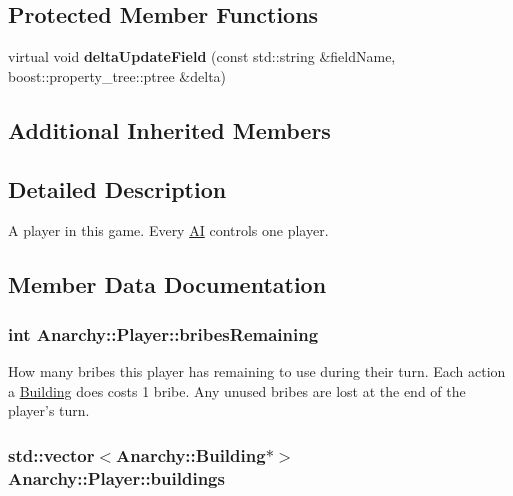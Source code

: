 \subsection*{Protected Member Functions}
\begin{DoxyCompactItemize}
\item 
\hypertarget{classAnarchy_1_1Player_a4a8fd3162e3a6eba89b48348c346c0c7}{virtual void {\bfseries delta\-Update\-Field} (const std\-::string \&field\-Name, boost\-::property\-\_\-tree\-::ptree \&delta)}\label{classAnarchy_1_1Player_a4a8fd3162e3a6eba89b48348c346c0c7}

\end{DoxyCompactItemize}
\subsection*{Additional Inherited Members}


\subsection{Detailed Description}
A player in this game. Every \hyperlink{classAnarchy_1_1AI}{A\-I} controls one player. 



\subsection{Member Data Documentation}
\hypertarget{classAnarchy_1_1Player_a439ac9bc65f337358c0169f6352a3336}{
\subsubsection[{bribes\-Remaining}]{\setlength{\rightskip}{0pt plus 5cm}int Anarchy\-::\-Player\-::bribes\-Remaining}}\label{classAnarchy_1_1Player_a439ac9bc65f337358c0169f6352a3336}


How many bribes this player has remaining to use during their turn. Each action a \hyperlink{classAnarchy_1_1Building}{Building} does costs 1 bribe. Any unused bribes are lost at the end of the player's turn. 

\hypertarget{classAnarchy_1_1Player_a2b80bb75995c73f78df64ca6241cbc7b}{
\subsubsection[{buildings}]{\setlength{\rightskip}{0pt plus 5cm}std\-::vector$<${\bf Anarchy\-::\-Building}$\ast$$>$ Anarchy\-::\-Player\-::buildings}}\label{classAnarchy_1_1Player_a2b80bb75995c73f78df64ca6241cbc7b}


